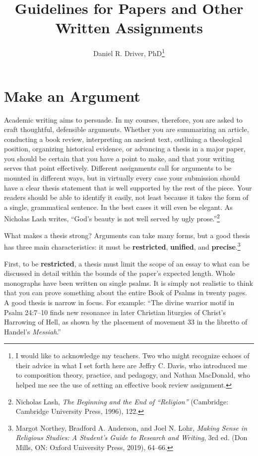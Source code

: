 \documentclass[11pt,twocolumn]{article}
\title{Guidelines for Papers and Other Written Assignments}
\author{Daniel R. Driver, PhD\thanks{I would like to acknowledge my
teachers. Two who might recognize echoes of their advice in what I set
forth here are Jeffry C. Davis, who introduced me to composition theory,
practice, and pedagogy, and Nathan MacDonald, who helped me see the use
of setting an effective book review assignment.}}
\date{}
\begin{document}
\maketitle

\section{Make an Argument}

Academic writing aims to persuade. In my courses, therefore, you are
asked to craft thoughtful, defensible arguments. Whether you are
summarizing an article, conducting a book review, interpreting an
ancient text, outlining a theological position, organizing historical
evidence, or advancing a thesis in a major paper, you should be certain
that you have a point to make, and that your writing serves that point
effectively. Different assignments call for arguments to be mounted in
different ways, but in virtually every case your submission should have
a clear thesis statement that is well supported by the rest of the
piece. Your readers should be able to identify it easily, not least
because it takes the form of a single, grammatical sentence. In the best
cases it will even be elegant. As Nicholas Lash writes, “God’s beauty is
not well served by ugly prose.”\footnote{Nicholas Lash, \emph{The
Beginning and the End of “Religion”} (Cambridge: Cambridge University
Press, 1996), 122.}

What makes a thesis strong? Arguments can take many forms, but a good
thesis has three main characteristics: it must be \textbf{restricted},
\textbf{unified}, and \textbf{precise}.\footnote{Margot Northey,
Bradford A. Anderson, and Joel N. Lohr, \emph{Making Sense in Religious
Studies: A Student's Guide to Research and Writing}, 3rd ed. (Don Mills,
ON: Oxford University Press, 2019), 64–66.}

First, to be \textbf{restricted}, a thesis must limit the scope of an
essay to what can be discussed in detail within the bounds of the
paper's expected length. Whole monographs have been written on single
psalms. It is simply not realistic to think that you can prove something
about the entire Book of Psalms in twenty pages. A good thesis is narrow
in focus. For example: “The divine warrior motif in Psalm 24:7–10 finds
new resonance in later Christian liturgies of Christ's Harrowing of
Hell, as shown by the placement of movement 33 in the libretto of
Handel's \emph{Messiah}.”
\end{document}
